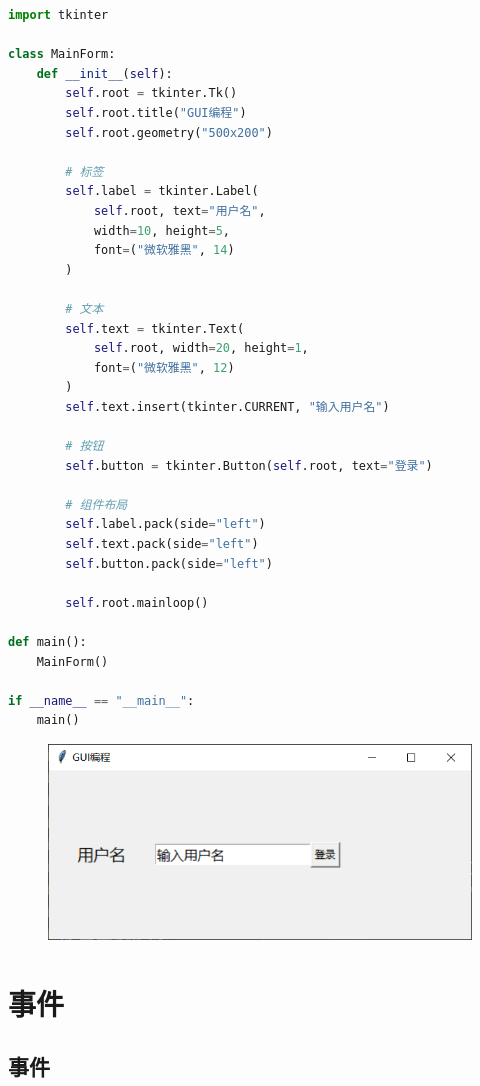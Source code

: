 \begin{lstlisting}[language=Python]
import tkinter

class MainForm:
    def __init__(self):
        self.root = tkinter.Tk()
        self.root.title("GUI编程")
        self.root.geometry("500x200")

        # 标签
        self.label = tkinter.Label(
            self.root, text="用户名",
            width=10, height=5,
            font=("微软雅黑", 14)
        )

        # 文本
        self.text = tkinter.Text(
            self.root, width=20, height=1,
            font=("微软雅黑", 12)
        )
        self.text.insert(tkinter.CURRENT, "输入用户名")

        # 按钮
        self.button = tkinter.Button(self.root, text="登录")

        # 组件布局
        self.label.pack(side="left")
        self.text.pack(side="left")
        self.button.pack(side="left")

        self.root.mainloop()

def main():
    MainForm()

if __name__ == "__main__":
    main()
\end{lstlisting}

\begin{tcolorbox}
	\begin{figure}[H]
		\centering
		\includegraphics[]{img/C13/13-1/2.png}
	\end{figure}
\end{tcolorbox}

\newpage

\section{事件}

\subsection{事件}


